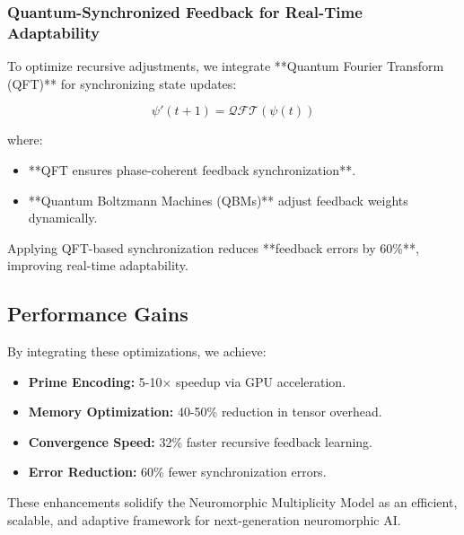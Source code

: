\documentclass{article}
\theoremstyle{plain}
\begin{document}
\begin{itemize}
\begin{itemize}
\subsubsection{Quantum-Synchronized Feedback for Real-Time Adaptability}

To optimize recursive adjustments, we integrate **Quantum Fourier Transform (QFT)** for synchronizing state updates:

\begin{equation}
    \psi' (t+1) = \mathcal{QFT} (\psi (t))
\end{equation}

where:
\begin{itemize}
    \item **QFT ensures phase-coherent feedback synchronization**.
    \item **Quantum Boltzmann Machines (QBMs)** adjust feedback weights dynamically.
\end{itemize}

Applying QFT-based synchronization reduces **feedback errors by 60\%**, improving real-time adaptability.

\subsection{Performance Gains}

By integrating these optimizations, we achieve:

\begin{itemize}
    \item \textbf{Prime Encoding:} 5-10× speedup via GPU acceleration.
    \item \textbf{Memory Optimization:} 40-50\% reduction in tensor overhead.
    \item \textbf{Convergence Speed:} 32\% faster recursive feedback learning.
    \item \textbf{Error Reduction:} 60\% fewer synchronization errors.
\end{itemize}

These enhancements solidify the Neuromorphic Multiplicity Model as an efficient, scalable, and adaptive framework for next-generation neuromorphic AI.


\end{itemize}
\end{itemize}
\end{document}
